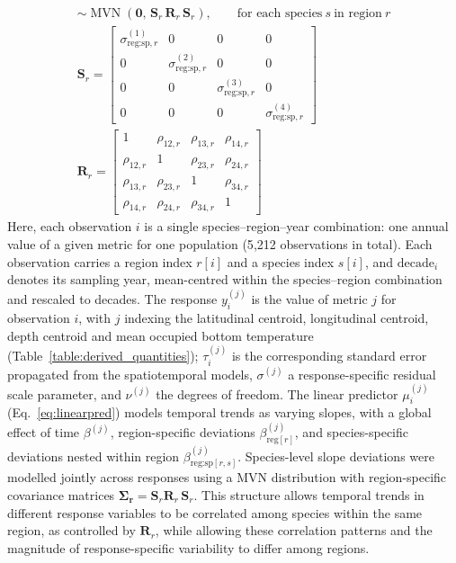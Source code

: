 \documentclass[9pt,twocolumn,twoside]{pnas-new}
\begin{document}
{\begin{gather}
\sim 
\operatorname{MVN}\!\left(
\mathbf{0},\,
\mathbf{S}_{r}\,\mathbf{R}_{r}\,\mathbf{S}_{r}
\right),
\qquad \text{for each species}~s~\text{in region}~r \label{eq:mvn}
\\
\mathbf{S}_{r} =
\begin{bmatrix}
\sigma^{(1)}_{\text{reg:sp},r} & 0 & 0 & 0 \\
0 & \sigma^{(2)}_{\text{reg:sp},r} & 0 & 0 \\
0 & 0 & \sigma^{(3)}_{\text{reg:sp},r} & 0 \\
0 & 0 & 0 & \sigma^{(4)}_{\text{reg:sp},r}
\end{bmatrix} \label{eq:sdmatrix}
\\
\mathbf{R}_{r} =
\begin{bmatrix}
1 & \rho_{12,r} & \rho_{13,r} & \rho_{14,r} \\
\rho_{12,r} & 1 & \rho_{23,r} & \rho_{24,r} \\
\rho_{13,r} & \rho_{23,r} & 1 & \rho_{34,r} \\
\rho_{14,r} & \rho_{24,r} & \rho_{34,r} & 1
\end{bmatrix} \label{eq:corrmatrix}
\end{gather}
\noindent Here, each observation $i$ is a single species--region--year combination: one annual value of a given metric for one population (5{,}212 observations in total). Each observation carries a region index $r[i]$ and a species index $s[i]$, and $\mathrm{decade}_i$ denotes its sampling year, mean-centred within the species--region combination and rescaled to decades. The response $y^{(j)}_i$ is the value of metric $j$ for observation $i$, with $j$ indexing the latitudinal centroid, longitudinal centroid, depth centroid and mean occupied bottom temperature (Table~\ref{table:derived_quantities}); $\tau^{(j)}_i$ is the corresponding standard error propagated from the spatiotemporal models, $\sigma^{(j)}$ a response-specific residual scale parameter, and $\nu^{(j)}$ the degrees of freedom. The linear predictor $\mu^{(j)}_i$ (Eq.~\ref{eq:linearpred}) models temporal trends as varying slopes, with a global effect of time $\beta^{(j)}$, region-specific deviations $\beta^{(j)}_{\text{reg}[r]}$, and species-specific deviations nested within region $\beta^{(j)}_{\text{reg:sp}[r,s]}$.
Species-level slope deviations were modelled jointly across responses using a MVN distribution with region-specific covariance matrices $\boldsymbol{\Sigma_r} = \mathbf{S}_{r}\mathbf{R}_{r}\,\mathbf{S}_{r}$. This structure allows temporal trends in different response variables to be correlated among species within the same region, as controlled by $\mathbf{R}_{r}$, while allowing these correlation patterns and the magnitude of response-specific variability to differ among regions.
}
\end{document}
